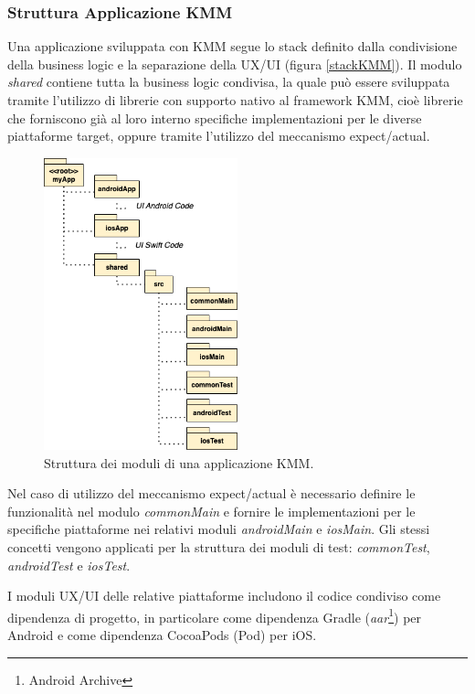\subsubsection{Struttura Applicazione KMM}
Una applicazione sviluppata con KMM segue lo stack definito dalla condivisione della business logic e la separazione della UX/UI (figura \ref{stackKMM}). Il modulo \textit{shared} contiene tutta la business logic condivisa, la quale può essere sviluppata tramite l'utilizzo di librerie con supporto nativo al framework KMM, cioè librerie che forniscono già al loro interno specifiche implementazioni per le diverse piattaforme target, oppure tramite l'utilizzo del meccanismo expect/actual.

\begin{figure}[H]
    \centering
    \includegraphics[width=0.5\textwidth]{img/struttura_app_kmm.png}
    \caption{Struttura dei moduli di una applicazione KMM.}
\end{figure}

Nel caso di utilizzo del meccanismo expect/actual è necessario definire le funzionalità nel modulo \textit{commonMain} e fornire le implementazioni per le specifiche piattaforme nei relativi moduli \textit{androidMain} e \textit{iosMain}. Gli stessi concetti vengono applicati per la struttura dei moduli di test: \textit{commonTest}, \textit{androidTest} e \textit{iosTest}.

I moduli UX/UI delle relative piattaforme includono il codice condiviso come dipendenza di progetto, in particolare come dipendenza Gradle (\textit{aar}\footnote{Android Archive}) per Android e come dipendenza CocoaPods (Pod) per iOS.

